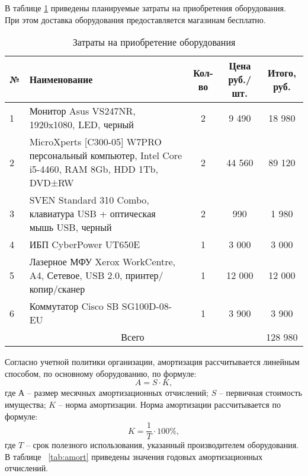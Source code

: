 В таблице \ref{tab:acc} приведены планируемые затраты на приобретения оборудования. При этом доставка оборудования предоставляется магазинам бесплатно.
\begin{table}[h!]
	\caption{Затраты на приобретение оборудования}
	\small
	\centering
	\begin{tabular}{|p{0.4cm}|p{7cm}|c|c|c|}
		\hline
		№ & Наименование & Кол-во & Цена руб./шт. & Итого, руб.  \\
		\hline
		1 & Монитор Asus VS247NR, 1920x1080, LED, черный & 2 & 9 490 & 18 980 \\
		\hline
		2 & MicroXperts [C300-05] W7PRO персональный компьютер, Intel Core i5-4460, RAM 8Gb, HDD 1Tb, DVD±RW & 2 & 44 560 & 89 120 \\
		\hline
		3 & SVEN Standard 310 Combo, клавиатура USB + оптическая мышь USB, черный & 2 & 990 & 1 980 \\
		\hline
		4 & ИБП CyberPower UT650E & 1 & 3 000 & 3 000 \\
		\hline
		5 & Лазерное МФУ Xerox WorkCentre, A4, Сетевое, USB 2.0, принтер/копир/сканер & 1 & 12 000 & 12 000 \\
		\hline
		6 & Коммутатор Cisco SB SG100D-08-EU & 1 & 3 900 & 3 900 \\
		\hline
		\multicolumn{4}{|c|}{Всего} & 128 980 \\
		\hline
	\end{tabular}
	\label{tab:acc}
\end{table}

Согласно учетной политики организации, амортизация рассчитывается линейным способом, по основному оборудованию, по формуле:
\begin{equation*}
	A = S \cdot K,
\end{equation*}
где $А$ – размер месячных амортизационных отчислений;
$S$ – первичная стоимость имущества;
$K$ – норма амортизации.
Норма амортизации рассчитывается по формуле:
\begin{equation*}
	K = \frac{1}{T} \cdot 100\%,
\end{equation*}
где $T$ -- срок полезного использования, указанный производителем оборудования.
В таблице ~\ref{tab:amort} приведены значения годовых амортизационных отчислений.

